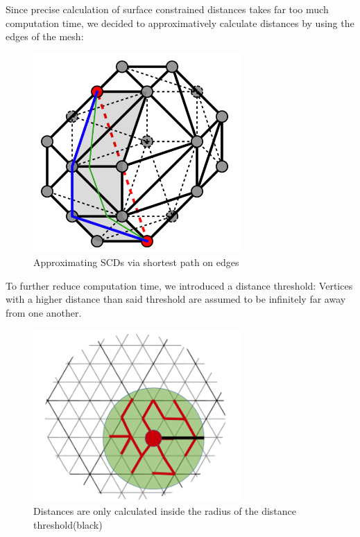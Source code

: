 \clearpage

Since precise calculation of surface constrained distances takes far too much computation time, we decided to approximatively calculate distances by using the edges of the mesh:

\begin{figure}[h]
	\begin{center}
		\includegraphics[width=8cm]{figures/scdcEdges.png}
		\caption{Approximating SCDs via shortest path on edges}
	\end{center}
\end{figure}

To further reduce computation time, we introduced a distance threshold: Vertices with a higher distance than said threshold are assumed to be infinitely far away from one another.

\begin{figure}[h]
	\begin{center}
		\includegraphics[width=8cm]{figures/cancelDist.png}
		\caption{Distances are only calculated inside the radius of the distance threshold(black)}
	\end{center}
\end{figure}

